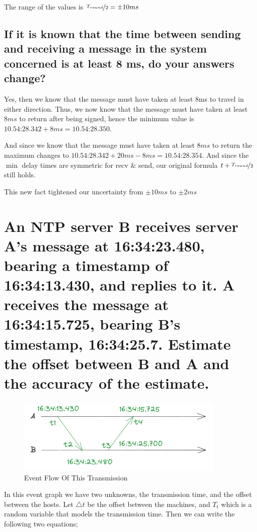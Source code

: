 \documentclass{article}
\begin{document}
The range of the values is $\nicefrac{T_{round}}{2} = \pm 10ms$

\subsection{If it is known that the time between sending and receiving a message in the system concerned is at least 8
ms, do your answers change?}
Yes, then we know that the message must have taken at least 8ms to travel in either direction. Thus, we now know
that the message must have taken at least $8ms$ to return after being signed, hence the minimum value is $\textit{10.54:28.342} + 8ms = \textit{10.54:28.350}$.

And since we know that the message must have taken at least $8ms$ to return the maximum changes to $\textit{10.54:28.342} + 20ms - 8ms = \textit{10.54:28.354}$.
And since the $\min$ delay times are symmetric for recv \& send, our original formula $t + \nicefrac{T_{round}}{2}$ still holds.

This new fact tightened our uncertainty from $\pm 10ms$ to $\pm 2ms$

\section{An NTP server B receives server A’s message at 16:34:23.480, bearing a timestamp of
16:34:13.430, and replies to it. A receives the message at 16:34:15.725, bearing B’s
timestamp, 16:34:25.7. Estimate the offset between B and A and the accuracy of the
estimate.}

\begin{figure}[H]
    \centering
    \includegraphics[width=10cm]{q2_fig1.png}
    \caption{Event Flow Of This Transmission}
\end{figure}

In this event graph we have two unknowns, the transmission time, and the offset between the hosts. Let $\triangle t$ be the
offset between the machines, and $T_{t}$ which is a random variable that models the transmission time. Then we can write the following two equations;
\end{document}
